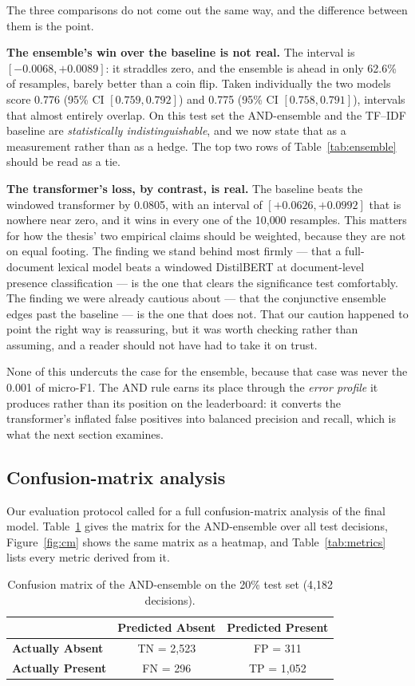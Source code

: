 The three comparisons do not come out the same way, and the difference between them is the point.

\textbf{The ensemble's win over the baseline is not real.} The interval is $[-0.0068, +0.0089]$: it straddles zero, and the ensemble is ahead in only 62.6\% of resamples, barely better than a coin flip. Taken individually the two models score 0.776 (95\% CI $[0.759, 0.792]$) and 0.775 (95\% CI $[0.758, 0.791]$), intervals that almost entirely overlap. On this test set the AND-ensemble and the TF--IDF baseline are \emph{statistically indistinguishable}, and we now state that as a measurement rather than as a hedge. The top two rows of Table~\ref{tab:ensemble} should be read as a tie.

\textbf{The transformer's loss, by contrast, is real.} The baseline beats the windowed transformer by 0.0805, with an interval of $[+0.0626, +0.0992]$ that is nowhere near zero, and it wins in every one of the 10{,}000 resamples. This matters for how the thesis' two empirical claims should be weighted, because they are not on equal footing. The finding we stand behind most firmly --- that a full-document lexical model beats a windowed DistilBERT at document-level presence classification --- is the one that clears the significance test comfortably. The finding we were already cautious about --- that the conjunctive ensemble edges past the baseline --- is the one that does not. That our caution happened to point the right way is reassuring, but it was worth checking rather than assuming, and a reader should not have had to take it on trust.

None of this undercuts the case for the ensemble, because that case was never the 0.001 of micro-F1. The AND rule earns its place through the \emph{error profile} it produces rather than its position on the leaderboard: it converts the transformer's inflated false positives into balanced precision and recall, which is what the next section examines.

\subsection{Confusion-matrix analysis}
Our evaluation protocol called for a full confusion-matrix analysis of the final model. Table~\ref{tab:cm} gives the matrix for the AND-ensemble over all test decisions, Figure~\ref{fig:cm} shows the same matrix as a heatmap, and Table~\ref{tab:metrics} lists every metric derived from it.

\begin{table}[ht]
\centering
\caption{Confusion matrix of the AND-ensemble on the 20\% test set (4{,}182 decisions).}
\label{tab:cm}
\begin{tabular}{lcc}
\toprule
 & \textbf{Predicted Absent} & \textbf{Predicted Present}\\
\midrule
\textbf{Actually Absent}  & TN = 2{,}523 & FP = 311\\
\textbf{Actually Present} & FN = 296     & TP = 1{,}052\\
\bottomrule
\end{tabular}
\end{table}

